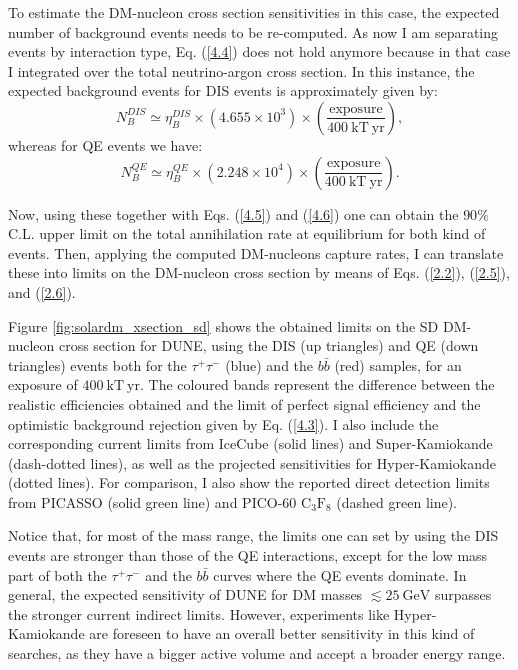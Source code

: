 To estimate the DM-nucleon cross section sensitivities in this case, the expected number of background events needs to be re-computed. As now I am separating events by interaction type, Eq. (\ref{4.4}) does not hold anymore because in that case I integrated over the total neutrino-argon cross section. In this instance, the expected background events for DIS events is approximately given by:
\begin{equation}\label{6.11}
	N_{B}^{DIS} \simeq \eta_{B}^{DIS} \times \left(4.655 \times 10^{3}\right) \times \left(\frac{\mathrm{exposure}}{400 \ \mathrm{kT} \ \mathrm{yr}}\right),
\end{equation}
whereas for QE events we have:
\begin{equation}\label{6.12}
	N_{B}^{QE} \simeq \eta_{B}^{QE} \times \left(2.248\times 10^{4}\right) \times \left(\frac{\mathrm{exposure}}{400 \ \mathrm{kT} \ \mathrm{yr}}\right).
\end{equation}

Now, using these together with Eqs. (\ref{4.5}) and (\ref{4.6}) one can obtain the $90\%$ C.L. upper limit on the total annihilation rate at equilibrium for both kind of events. Then, applying the computed DM-nucleons capture rates, I can translate these into limits on the DM-nucleon cross section by means of Eqs. (\ref{2.2}), (\ref{2.5}), and (\ref{2.6}).

Figure \ref{fig:solardm_xsection_sd} shows the obtained limits on the SD DM-nucleon cross section for DUNE, using the DIS (up triangles) and QE (down triangles) events both for the $\tau^{+}\tau^{-}$ (blue) and the $b\bar{b}$ (red) samples, for an exposure of $400 \ \mathrm{kT} \ \mathrm{yr}$. The coloured bands represent the difference between the realistic efficiencies obtained and the limit of perfect signal efficiency and the optimistic background rejection given by Eq. (\ref{4.3}). I also include the corresponding current limits from IceCube \cite{IceCube2021} (solid lines) and Super-Kamiokande \cite{Super-Kamiokande2015} (dash-dotted lines), as well as the projected sensitivities for Hyper-Kamiokande \cite{Bell2021} (dotted lines). For comparison, I also show the reported direct detection limits from PICASSO \cite{Behnke2016} (solid green line) and PICO-60 $\mathrm{C}_{3}\mathrm{F}_{8}$ \cite{PICO2019} (dashed green line).

Notice that, for most of the mass range, the limits one can set by using the DIS events are stronger than those of the QE interactions, except for the low mass part of both the $\tau^{+}\tau^{-}$ and the $b\bar{b}$ curves where the QE events dominate. In general, the expected sensitivity of DUNE for DM masses $\lesssim 25 \ \mathrm{GeV}$ surpasses the stronger current indirect limits. However, experiments like Hyper-Kamiokande are foreseen to have an overall better sensitivity in this kind of searches, as they have a bigger active volume and accept a broader energy range.

